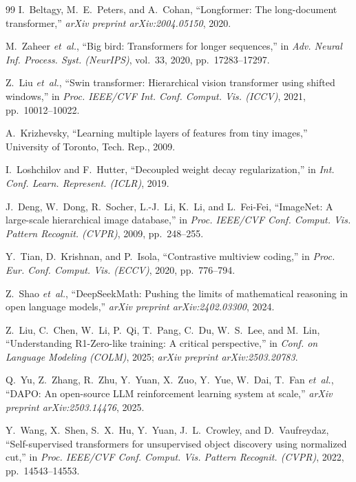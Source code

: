 \documentclass[11pt,a4paper]{article}
\begin{document}
\begin{thebibliography}{99}
I.~Beltagy, M.~E.~Peters, and A.~Cohan,
``Longformer: The long-document transformer,''
\emph{arXiv preprint arXiv:2004.05150}, 2020.

M.~Zaheer \emph{et~al.},
``Big bird: Transformers for longer sequences,''
in \emph{Adv. Neural Inf. Process. Syst. (NeurIPS)}, vol.~33, 2020, pp.~17283--17297.

Z.~Liu \emph{et~al.},
``Swin transformer: Hierarchical vision transformer using shifted windows,''
in \emph{Proc. IEEE/CVF Int. Conf. Comput. Vis. (ICCV)}, 2021, pp.~10012--10022.

A.~Krizhevsky,
``Learning multiple layers of features from tiny images,''
University of Toronto, Tech. Rep., 2009.

I.~Loshchilov and F.~Hutter,
``Decoupled weight decay regularization,''
in \emph{Int. Conf. Learn. Represent. (ICLR)}, 2019.

J.~Deng, W.~Dong, R.~Socher, L.-J.~Li, K.~Li, and L.~Fei-Fei,
``ImageNet: A large-scale hierarchical image database,''
in \emph{Proc. IEEE/CVF Conf. Comput. Vis. Pattern Recognit. (CVPR)}, 2009, pp.~248--255.

Y.~Tian, D.~Krishnan, and P.~Isola,
``Contrastive multiview coding,''
in \emph{Proc. Eur. Conf. Comput. Vis. (ECCV)}, 2020, pp.~776--794.

Z.~Shao \emph{et~al.},
``DeepSeekMath: Pushing the limits of mathematical reasoning in open language models,''
\emph{arXiv preprint arXiv:2402.03300}, 2024.

Z.~Liu, C.~Chen, W.~Li, P.~Qi, T.~Pang, C.~Du, W.~S.~Lee, and M.~Lin,
``Understanding R1-Zero-like training: A critical perspective,''
in \emph{Conf. on Language Modeling (COLM)}, 2025; \emph{arXiv preprint arXiv:2503.20783}.

Q.~Yu, Z.~Zhang, R.~Zhu, Y.~Yuan, X.~Zuo, Y.~Yue, W.~Dai, T.~Fan \emph{et~al.},
``DAPO: An open-source LLM reinforcement learning system at scale,''
\emph{arXiv preprint arXiv:2503.14476}, 2025.

Y.~Wang, X.~Shen, S.~X.~Hu, Y.~Yuan, J.~L.~Crowley, and D.~Vaufreydaz,
``Self-supervised transformers for unsupervised object discovery using normalized cut,''
in \emph{Proc. IEEE/CVF Conf. Comput. Vis. Pattern Recognit. (CVPR)}, 2022, pp.~14543--14553.

\end{thebibliography}
\end{document}
